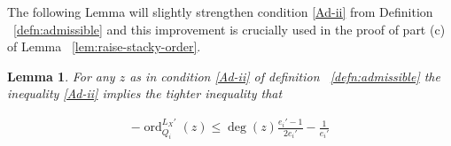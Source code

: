 \documentclass{amsart}
\theoremstyle{plain}
\newtheorem{lem}[thm]{Lemma}
\theoremstyle{definition}
\theoremstyle{remark}
\numberwithin{equation}{section}
\newcommand\BN{{\mathbb N}}
\DeclareMathOperator{\ord}{ord}
\newcommand\sx{\mathscr X}
\newcommand \subhalf[1]{\frac{{#1} - 1}{2{#1}}}
\newcommand{\halfcan}{L}
\begin{document}
%

The following Lemma will slightly strengthen condition \ref{Ad-ii} from Definition ~\ref{defn:admissible} and this improvement is crucially used in the proof of part (c) of Lemma ~\ref{lem:raise-stacky-order}.

\begin{lem}
\label{lem:admissible_inequality}
For any $z$ as in condition \ref{Ad-ii} of definition ~\ref{defn:admissible} the inequality \ref{Ad-ii} implies the
tighter inequality that

\begin{align*}
	-\ord_{Q_i}
^{\halfcan_X'}(z) \leq \deg(z) \subhalf{e_i'} -\frac{1}{e_i'}
\end{align*}
\end{lem}
\end{document}
